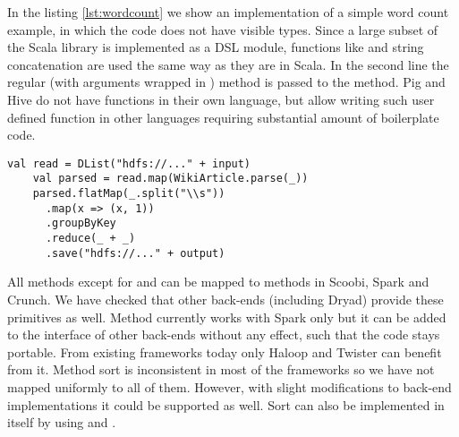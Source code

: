 In the listing \ref{lst:wordcount} we show an implementation of a simple word count example, in which the code does not have visible  types. Since a large subset of the Scala library is implemented as a DSL module, functions like  and string concatenation are used the same way as they are in Scala. In the second line the regular (with arguments wrapped in ) method  is passed to the  method. Pig and Hive do not have functions in their own language, but allow writing such user defined function in other languages requiring substantial amount of boilerplate code.  

\begin{lstlisting}[name=code, caption=Example of word count program where type inference removes the need to declare any \scode{Rep} types., captionpos=b, label=lst:wordcount, float=t]
    val read = DList("hdfs://..." + input)
    val parsed = read.map(WikiArticle.parse(_))
    parsed.flatMap(_.split("\\s"))
      .map(x => (x, 1))
      .groupByKey
      .reduce(_ + _)
      .save("hdfs://..." + output)
\end{lstlisting}

All methods except for  and  can be mapped to methods in Scoobi, Spark and Crunch. We have checked that other back-ends (including Dryad) provide these primitives as well. Method  currently works with Spark only but it can be added to the interface of other back-ends without any effect, such that the code stays portable. From existing frameworks today only Haloop and Twister  can benefit from it. Method sort is inconsistent in most of the frameworks so we have not mapped uniformly to all of them. However, with slight modifications to back-end implementations it could be supported as well. Sort can also be implemented in \tool itself by using  and .